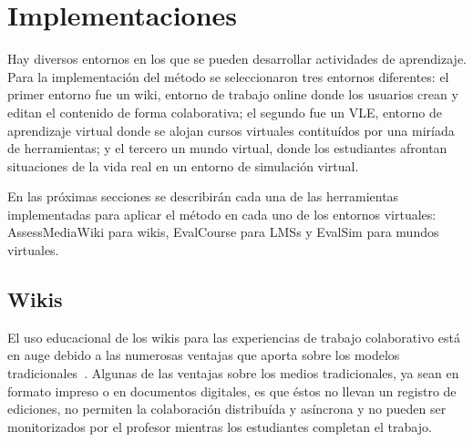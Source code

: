 


\section{Implementaciones}
\label{sec:tools}

Hay diversos entornos en los que se pueden desarrollar actividades de aprendizaje. Para la implementación del método se seleccionaron tres entornos diferentes: el primer entorno fue un wiki, entorno de trabajo online donde los usuarios crean y editan el contenido de forma colaborativa; el segundo fue un VLE, entorno de aprendizaje virtual donde se alojan cursos virtuales contituídos por una miríada de herramientas; y el tercero un mundo virtual, donde los estudiantes afrontan situaciones de la vida real en un entorno de simulación virtual.

En las próximas secciones se describirán cada una de las herramientas implementadas para aplicar el método en cada uno de los entornos virtuales: AssessMediaWiki para wikis, EvalCourse para LMSs y EvalSim para mundos virtuales.

\subsection{Wikis}

El uso educacional de los wikis para las experiencias de trabajo colaborativo está en auge debido a las numerosas ventajas que aporta sobre los modelos tradicionales~\cite{elgort2008wiki}. Algunas de las ventajas sobre los medios tradicionales, ya sean en formato impreso o en documentos digitales, es que éstos no llevan un registro de ediciones, no permiten la colaboración distribuída y asíncrona y no pueden ser monitorizados por el profesor mientras los estudiantes completan el trabajo.

